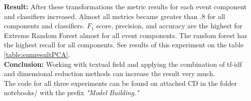 \noindent\textbf{Result:} After these transformations the metric results for each event component and classifiers increased. Almost all metrics became greater than .8 for all components and classifiers. $F_1$ score, precision, and accuracy are the highest for Extreme Random Forest almost for all event components. The random forest has the highest recall for all components. See results of this experiment on the table \ref{table:sumresultPCA}.\\

\noindent\textbf{Conclusion:} Working with textual field and applying the combination of tf-idf and dimensional reduction methods can increase the result very much.\\

The code for all three experiments can be found on attached CD in the folder notebooks/ with the prefix \textit{"Model Building."}



